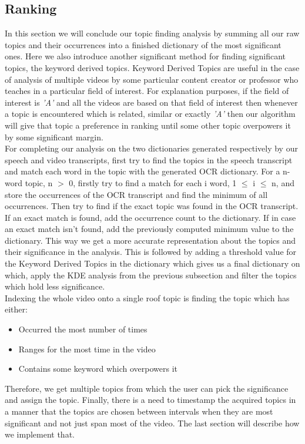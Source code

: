 \documentclass[conference]{IEEEtran}
\begin{document}
\subsection{Ranking}
In this section we will conclude our topic finding analysis by summing all our raw topics and their occurrences into a finished dictionary of the most significant ones. Here we also introduce another significant method for finding significant topics, the keyword derived topics.
	Keyword Derived Topics are useful in the case of analysis of multiple videos by some particular content creator or professor who teaches in a particular field of interest. For explanation purposes, if the field of interest is \textit{'A'} and all the videos are based on that field of interest then whenever a topic is encountered which is related, similar or exactly \textit{'A'} then our algorithm will give that topic a preference in ranking until some other topic overpowers it by some significant margin.\\
\indent For completing our analysis on the two dictionaries generated respectively by our speech and video transcripts, first try to find the topics in the speech transcript and match each word in the topic with the generated OCR dictionary. For a n-word topic, n $>$ 0, firstly try to find a match for each i word, 1 $\leq$ i $\leq$ n, and store the occurrences of the OCR transcript and find the minimum of all occurrences. Then try to find if the exact topic was found in the OCR transcript. If an exact match is found, add the occurrence count to the dictionary. If in case an exact match isn’t found, add the previously computed minimum value to the dictionary. This way we get a more accurate representation about the topics and their significance in the analysis. This is followed by adding a threshold value for the Keyword Derived Topics in the dictionary which gives us a final dictionary on which, apply the KDE analysis from the previous subsection and filter the topics which hold less significance.\\
\indent Indexing the whole video onto a single roof topic is finding the topic which has either:
\begin{itemize}
\item Occurred the most number of times
\item Ranges for the most time in the video
\item Contains some keyword which overpowers it
\end{itemize}
\indent Therefore, we get multiple topics from which the user can pick the significance and assign the topic. Finally, there is a need to timestamp the acquired topics in a manner that the topics are chosen between intervals when they are most significant and not just span most of the video. The last section will describe how we implement that.
\end{document}
